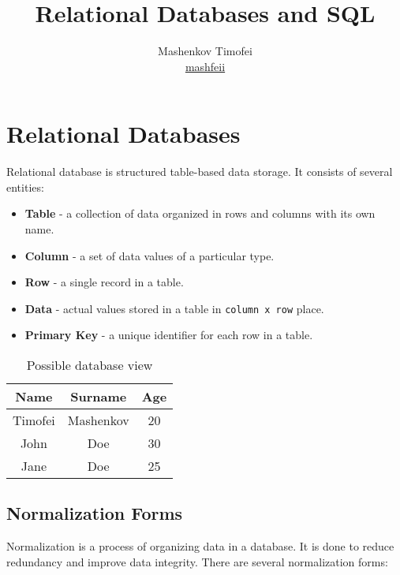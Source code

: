 \documentclass{article}
\title{Relational Databases and SQL}
\author{Mashenkov Timofei \\ \href{t.me/mashfeii}{mashfeii}}
\newcommand{\code}[1]{\colorbox{light-gray}{\texttt{#1}}}
\begin{document}
\maketitle{}

\section{Relational Databases}
\noindent

Relational database is structured table-based data storage. It consists of several entities:

\begin{itemize}
  \item \textbf{Table} - a collection of data organized in rows and columns with its own name.
  \item \textbf{Column} - a set of data values of a particular type. 
  \item \textbf{Row} - a single record in a table.
  \item \textbf{Data} - actual values stored in a table in \code{column x row} place.
  \item \textbf{Primary Key} - a unique identifier for each row in a table.
\end{itemize}


\begin{table}[H]
  \centering
  \begin{tabular}{|c|c|c|}
    \toprule
    Name & Surname & Age \\ \midrule
    Timofei & Mashenkov & 20 \\
    John & Doe & 30 \\ 
    Jane & Doe & 25 \\ \bottomrule 
  \end{tabular}
  \caption{Possible database view}
\end{table}

\subsection{Normalization Forms}
\noindent

Normalization is a process of organizing data in a database. It is done to reduce redundancy and improve data integrity. There are several normalization forms:
\end{document}
